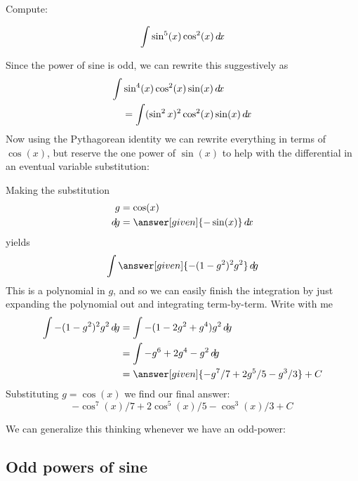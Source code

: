 \documentclass{ximera}
\begin{document}
\begin{example}
  Compute:

  \[
  \int \sin^{5}(x) \cos^2(x) \mathop{}\!d\! x
  \]

  \begin{explanation}
   
    Since the power of sine is odd, we can rewrite this suggestively as
    \begin{align*}
    \int &\sin^4(x) \cos^2(x) \sin(x) \mathop{}\!d\! x \\
    &= \int (\sin^2x)^2 \cos^2(x) \sin(x) \mathop{}\!d\! x
    \end{align*}
    Now using the Pythagorean identity we can rewrite everything in
    terms of $\cos(x)$, but reserve the one power of $\sin(x)$ to help
    with the differential in an eventual variable substitution:
    \begin{center}%
    \end{center}
    Making the substitution
    \begin{align*}
      g &= \cos(x)\\
      \d g &=\answer[given]{-\sin(x)} \d x
    \end{align*}
    yields
    \[
    \int \answer[given]{-(1-g^2)^2 g^2} \d g
    \]
    This is a polynomial in $g$, and so we can easily finish the
    integration by just expanding the polynomial out and integrating
    term-by-term. Write with me
    \begin{align*}
      \int {-(1-g^2)^2 g^2} \d g &= \int -(1-2g^2+g^4)g^2\d g\\
      &= \int-g^6 + 2g^4-g^2 \d g\\
      &=\answer[given]{-g^7/7 + 2g^5/5 - g^3/3}+C
    \end{align*}
    Substituting $g = \cos(x)$ we find our final answer:
    \[
    -\cos^7(x)/7 + 2\cos^5(x)/5 - \cos^3(x)/3+C
    \]
  \end{explanation}
\end{example}

We can generalize this thinking whenever we have an odd-power:

\subsection{Odd powers of sine}
\end{document}
